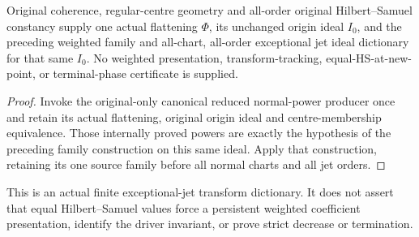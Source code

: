 \begin{theorem}
\label{hir:actual-original-weighted-generator-transform-jets}
\leanok
Original coherence, regular-centre geometry and all-order original Hilbert--Samuel constancy supply one actual flattening $\Phi$, its unchanged origin ideal $I_0$, and the preceding weighted family and all-chart, all-order exceptional jet ideal dictionary for that same $I_0$.
No weighted presentation, transform-tracking, equal-HS-at-new-point, or terminal-phase certificate is supplied.
\end{theorem}
\begin{proof}
Invoke the original-only canonical reduced normal-power producer once and retain its actual flattening, original origin ideal and centre-membership equivalence.
Those internally proved powers are exactly the hypothesis of the preceding family construction on this same ideal.
Apply that construction, retaining its one source family before all normal charts and all jet orders.
\end{proof}

This is an actual finite exceptional-jet transform dictionary. It does not assert that equal Hilbert--Samuel values force a persistent weighted coefficient presentation, identify the driver invariant, or prove strict decrease or termination.
